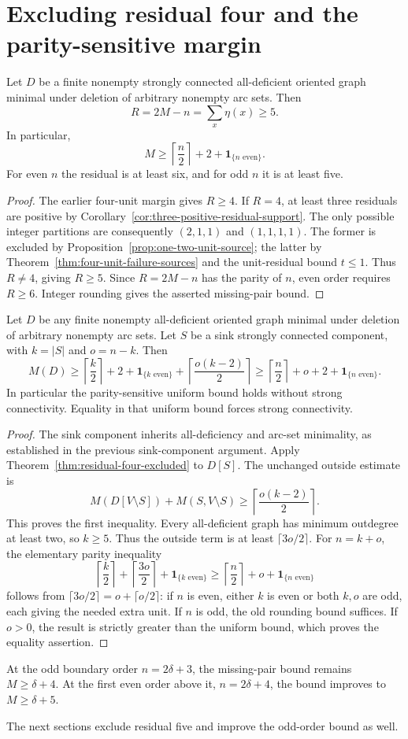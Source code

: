 \section{Excluding residual four and the parity-sensitive margin}
\label{sec:parity-five-margin}

\begin{theorem}\label{thm:residual-four-excluded}
Let $D$ be a finite nonempty strongly connected all-deficient oriented
graph minimal under deletion of arbitrary nonempty arc sets. Then
\[
 R=2M-n=\sum_x\eta(x)\ge5.
\]
In particular,
\[
 {
 M\ge\left\lceil\frac n2\right\rceil+2+\mathbf1_{\{n\text{ even}\}}.}
\]
For even $n$ the residual is at least six, and for odd $n$ it is
at least five.
\end{theorem}
\begin{proof}
The earlier four-unit margin gives $R\ge4$.
If $R=4$, at least three residuals are positive by
Corollary~\ref{cor:three-positive-residual-support}.
The only possible integer partitions are consequently $(2,1,1)$
and $(1,1,1,1)$.
The former is excluded by Proposition~\ref{prop:one-two-unit-source};
the latter by Theorem~\ref{thm:four-unit-failure-sources} and the
unit-residual bound $t\le1$.
Thus $R\ne4$, giving $R\ge5$.
Since $R=2M-n$ has the parity of $n$, even order requires $R\ge6$.
Integer rounding gives the asserted missing-pair bound.
\end{proof}

\begin{corollary}
\label{cor:parity-five-sink}
Let $D$ be any finite nonempty all-deficient oriented graph minimal
under deletion of arbitrary nonempty arc sets. Let $S$ be a sink
strongly connected component, with $k=|S|$ and $o=n-k$.
Then
\[
 M(D)\ge\left\lceil\frac{k}{2}\right\rceil+2+\mathbf1_{\{k\text{ even}\}}
       +\left\lceil\frac{o(k-2)}2\right\rceil
 \ge\left\lceil\frac n2\right\rceil+o+2+\mathbf1_{\{n\text{ even}\}}.
\]
In particular the parity-sensitive uniform bound holds without strong
connectivity. Equality in that uniform bound forces strong connectivity.
\end{corollary}
\begin{proof}
The sink component inherits all-deficiency and arc-set minimality,
as established in the previous sink-component argument. Apply
Theorem~\ref{thm:residual-four-excluded} to $D[S]$.
The unchanged outside estimate is
\[
 M(D[V\setminus S])+M(S,V\setminus S)
 \ge\left\lceil\frac{o(k-2)}2\right\rceil.
\]
This proves the first inequality. Every all-deficient graph has
minimum outdegree at least two, so $k\ge5$.
Thus the outside term is at least $\lceil3o/2\rceil$.
For $n=k+o$, the elementary parity inequality
\[
 \left\lceil\frac{k}{2}\right\rceil
 +\left\lceil\frac{3o}{2}\right\rceil
 +\mathbf1_{\{k\text{ even}\}}
 \ge\left\lceil\frac n2\right\rceil+o+\mathbf1_{\{n\text{ even}\}}
\]
follows from
$\lceil3o/2\rceil=o+\lceil o/2\rceil$:
if $n$ is even, either $k$ is even or both $k,o$ are odd, each giving
the needed extra unit. If $n$ is odd, the old rounding bound suffices.
If $o>0$, the result is strictly greater than the uniform bound,
which proves the equality assertion.
\end{proof}

At the odd boundary order $n=2\delta+3$, the missing-pair bound remains
$M\ge\delta+4$. At the first even order above it, $n=2\delta+4$,
the bound improves to $M\ge\delta+5$.


The next sections exclude residual five and improve the odd-order bound as well.
